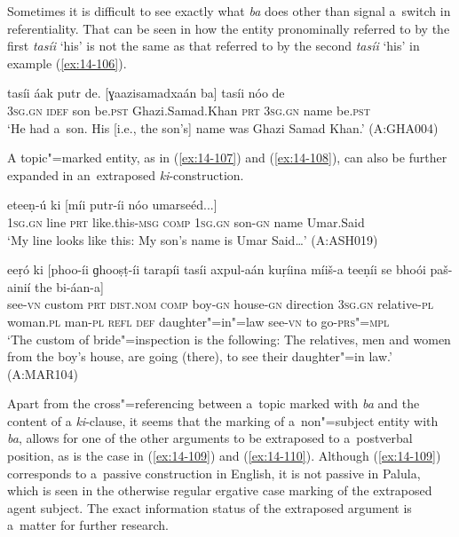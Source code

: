 Sometimes it is difficult to see exactly what \textit{ba} does other than signal a~switch in referentiality. That can be seen in how the entity pronominally referred to by the first \textit{tasíi} `his' is not the same as that referred to by the second \textit{tasíi} `his' in example (\ref{ex:14-106}).

\begin{exe}
\ex
\label{ex:14-106}
\gll tasíi áak putr de. [ɣaazisamadxaán ba]  tasíi nóo de \\
\textsc{3sg.gn} \textsc{idef} son be.\textsc{pst} Ghazi.Samad.Khan \textsc{prt}  \textsc{3sg.gn} name be.\textsc{pst} \\
\glt `He had a~son. His [i.e., the son's] name was Ghazi Samad Khan.' (A:GHA004)
\end{exe}

A topic"=marked entity, as in (\ref{ex:14-107}) and (\ref{ex:14-108}), can also be further expanded in an~extraposed \textit{ki}-construction.

\begin{exe}
\ex
\label{ex:14-107}
 eteeṇ-ú ki [míi putr-íi  nóo umarseéd...] \\
\textsc{1sg.gn} line \textsc{prt} like.this-\textsc{msg } \textsc{comp} \textsc{1sg.gn} son-\textsc{gn}  name Umar.Said \\
\glt `My line looks like this: My son's name is Umar Said{\ldots}' (A:ASH019)

\ex
\label{ex:14-108}
 eeṛó ki [phoo-íi  ɡhooṣṭ-íi tarapíi tasíi
  axpul-aán kuṛíina  míiš-a teeṇíi se bhoói paš-ainií the bi-áan-a] \\
see-\textsc{vn} custom \textsc{prt} \textsc{dist.nom} \textsc{comp} boy-\textsc{gn}  house-\textsc{gn} direction \textsc{3sg.gn} relative-\textsc{pl} woman.\textsc{pl}  man-\textsc{pl} \textsc{refl } \textsc{def} daughter"=in"=law see-\textsc{vn} to go-\textsc{prs"=mpl} \\
\glt `The custom of bride"=inspection is the following: The relatives, men and women from the boy's house, are going (there), to see their daughter"=in law.' (A:MAR104)
\end{exe}

Apart from the cross"=referencing between a~topic marked with \textit{ba} and the content of a \textit{ki}-clause, it seems that the marking of a~non"=subject entity with \textit{ba}, allows for one of the other arguments to be extraposed to a~postverbal position, as is the case in (\ref{ex:14-109}) and (\ref{ex:14-110}). Although (\ref{ex:14-109}) corresponds to a~passive construction in English, it is not passive in Palula, which is seen in the otherwise regular ergative case marking of the extraposed agent subject. The exact information status of the extraposed argument is a~matter for further research.


